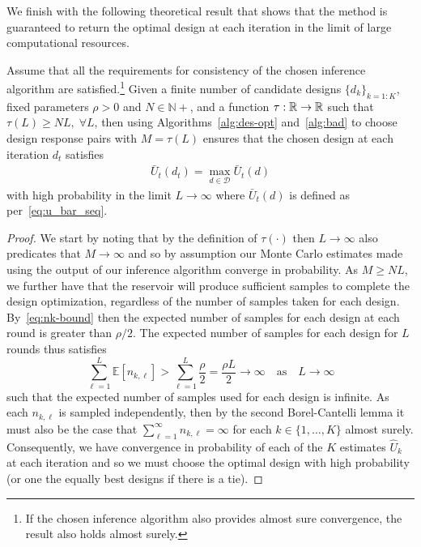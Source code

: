 We finish with the following theoretical result that
shows that the method is guaranteed to return the optimal design at each iteration in the limit of large
computational resources.
\begin{theorem}
	Assume that all the requirements for consistency of the chosen inference algorithm are satisfied.\footnote{If the
		chosen inference algorithm also provides almost sure convergence, the result also holds almost surely.}
	Given a finite number of candidate designs $\{d_k\}_{k=1:K}$, fixed parameters $\rho>0$ and $N\in\mathbb{N}+$, and a
	function $\tau : \mathbb{R} \rightarrow \mathbb{R}$ such that $\tau(L)\ge NL, \; \forall L$, then using
	Algorithms~\ref{alg:des-opt} and~\ref{alg:bad} to choose design response pairs with $M=\tau(L)$
	ensures that the chosen design at each iteration $d_t$ satisfies
	\begin{align}
	\bar{U}_t(d_t)= \max_{d\in\mathcal{D}} \bar{U}_t(d)
	\end{align}
	with high probability in the limit $L\rightarrow\infty$ where 
	$\bar{U}_t(d)$ is defined as per~\eqref{eq:u_bar_seq}.
\end{theorem}
\begin{proof}
	We start by noting that by the definition of $\tau(\cdot)$ then $L\rightarrow\infty$ also predicates
	that $M\rightarrow\infty$ and so by assumption our Monte Carlo estimates made using the output
	of our inference algorithm converge in probability.  As $M\ge NL$,
	we further have that the reservoir will produce sufficient samples
	to complete the design optimization, regardless of the number of samples taken for each design.
	By~\eqref{eq:nk-bound} then the expected number of samples for each design at each round
	is greater than $\rho/2$.  The expected number of samples for each design for $L$ rounds thus
	satisfies
	\[
	\sum_{\ell=1}^{L} \mathbb{E}[n_{k,\ell}] > \sum_{\ell=1}^{L} \frac{\rho}{2} = \frac{\rho L}{2}
	\rightarrow \infty \quad \text{as} \quad L\rightarrow \infty
	\]
	such that the expected number of samples used for each design is infinite.  As each $n_{k,\ell}$
	is sampled independently, then by the second Borel-Cantelli lemma it must also be the case
	that $\sum_{\ell=1}^{\infty} n_{k,\ell} = \infty$ for each $k\in \{1,\dots,K\}$ almost surely.
	Consequently, we have convergence in probability of each of the $K$ estimates $\hat{U}_k$
	at each iteration and so we must choose the optimal design with high probability (or one
	the equally best designs if there is a tie).
\end{proof}

